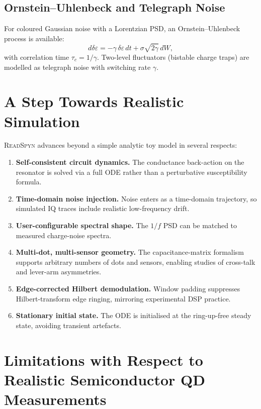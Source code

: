 \documentclass[11pt,a4paper]{article}
\begin{document}
\subsection{Ornstein--Uhlenbeck and Telegraph Noise}

For coloured Gaussian noise with a Lorentzian PSD, an Ornstein--Uhlenbeck
process is available:
\begin{equation}
  d\delta\varepsilon = -\gamma\,\delta\varepsilon\,dt
    + \sigma\sqrt{2\gamma}\,dW, \label{eq:ou}
\end{equation}
with correlation time $\tau_c=1/\gamma$.
Two-level fluctuators (bistable charge traps) are modelled as telegraph noise
with switching rate $\gamma$.

\section{A Step Towards Realistic Simulation}

\textsc{ReadSpyn} advances beyond a simple analytic toy model in several
respects:
\begin{enumerate}[label=\arabic*.]
  \item \textbf{Self-consistent circuit dynamics.} The conductance back-action
    on the resonator is solved via a full ODE rather than a perturbative
    susceptibility formula.
  \item \textbf{Time-domain noise injection.} Noise enters as a time-domain
    trajectory, so simulated IQ traces include realistic low-frequency drift.
  \item \textbf{User-configurable spectral shape.} The $1/f$ PSD can be matched
    to measured charge-noise spectra.
  \item \textbf{Multi-dot, multi-sensor geometry.} The capacitance-matrix
    formalism supports arbitrary numbers of dots and sensors, enabling studies
    of cross-talk and lever-arm asymmetries.
  \item \textbf{Edge-corrected Hilbert demodulation.} Window padding suppresses
    Hilbert-transform edge ringing, mirroring experimental DSP practice.
  \item \textbf{Stationary initial state.} The ODE is initialised at the
    ring-up-free steady state, avoiding transient artefacts.
\end{enumerate}

\section{Limitations with Respect to Realistic Semiconductor QD Measurements}
\label{sec:limitations}
\end{document}
